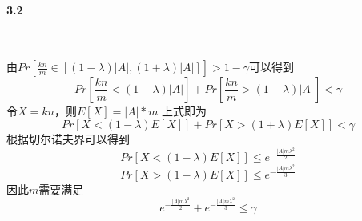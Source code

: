 \paragraph{3.2}~{}

由$Pr[\frac{kn}{m} \in [(1-\lambda)|A|, (1+\lambda)|A|]] > 1-\gamma$可以得到
$$Pr[\frac{kn}{m} < (1-\lambda)|A|] + Pr[\frac{kn}{m} > (1+\lambda)|A|] < \gamma$$
令$X = kn$，则$E[X] = |A|*m$
上式即为
$$Pr[X < (1-\lambda)E[X]] + Pr[X > (1+\lambda)E[X]] < \gamma$$
根据切尔诺夫界可以得到
$$Pr[X < (1-\lambda)E[X]] \le e^{-\frac{|A| m\lambda^2}{2}}$$
$$Pr[X > (1-\lambda)E[X]] \le e^{-\frac{|A| m\lambda^2}{3}}$$
因此$m$需要满足
$$e^{-\frac{|A| m\lambda^2}{2}} + e^{-\frac{|A| m\lambda^2}{3}} \le \gamma$$